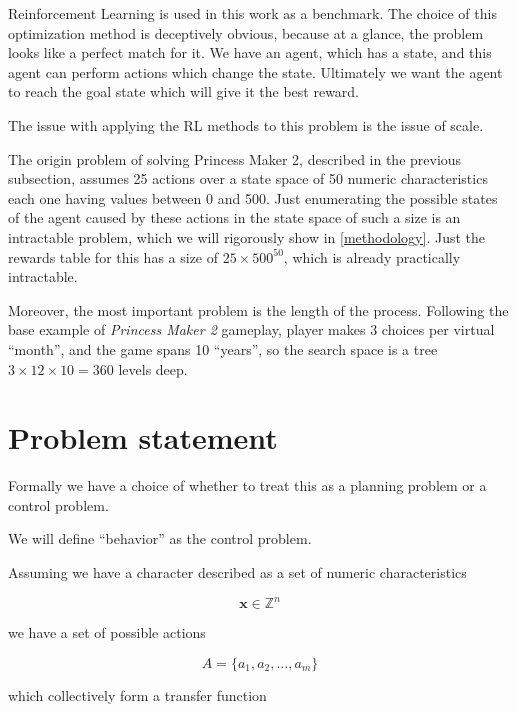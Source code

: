 \documentclass[11pt, a4paper]{article}
\begin{document}
	Reinforcement Learning \cite{sutton2018reinforcement} is used in this work as a benchmark.
	The choice of this optimization method is deceptively obvious, because at a glance, the problem looks like a perfect match for it.
	We have an agent, which has a state, and this agent can perform actions which change the state.
	Ultimately we want the agent to reach the goal state which will give it the best reward.
	
	The issue with applying the RL methods to this problem is the issue of scale.

	The origin problem of solving Princess Maker 2, described in the previous subsection,  assumes 25 actions over a state space of 50 numeric characteristics each one having values between 0 and 500.
	Just enumerating the possible states of the agent caused by these actions in the state space of such a size is an intractable problem, which we will rigorously show in \ref{methodology}.
	Just the rewards table for this has a size of $25 \times 500^{50}$, which is already practically intractable.
	
	Moreover, the most important problem is the length of the process.
	Following the base example of \textit{Princess Maker 2} gameplay, player makes 3 choices per virtual ``month'', and the game spans 10 ``years'', so the search space is a tree $3 \times 12 \times 10 = 360$ levels deep.
	
	

	\section{Problem statement}\label{problem-statement}

	Formally we have a choice of whether to treat this as a planning problem or a control problem.

	We will define ``behavior'' as the control problem.

	Assuming we have a character described as a set of numeric characteristics
	
	\begin{equation}
		\mathbf{x} \in \mathbb{Z}^n
	\end{equation}
	
	we have a set of possible actions
	
	\begin{equation}
		A = \{a_1, a_2,\ldots, a_m\}
	\end{equation}
	
	which collectively form a transfer function
	
\end{document}
